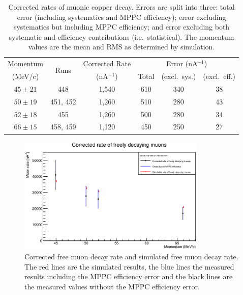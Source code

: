 \begin{table}
  \begin{center}
  \begin{tabular}{c | c | c | c | c | c}
    Momentum  & \multirow{2}{*}{Runs}  &  Corrected Rate  &  \multicolumn{3}{c}{Error (nA\(^{-1}\))}   \\
     (MeV/c)  &                        &  (nA\(^{-1}\))  &  Total  &  (excl.\ sys.)  &  (excl.\ eff.) \\
    \hline
    \(45 \pm 21\)  &       448  &  1,540  &  610  &  340  &  38  \\
    \(50 \pm 19\)  &  451, 452  &  1,260  &  510  &  280  &  43  \\
    \(52 \pm 18\)  &       455  &  1,260  &  500  &  280  &  34  \\
    \(66 \pm 15\)  &  458, 459  &  1,120  &  450  &  250  &  27  \\
  \end{tabular}
  \end{center}
  \caption{Corrected rates of muonic copper decay. Errors are split into three: total error (including systematics and MPPC efficiency); error excluding systematics but including MPPC efficiency; and error excluding both systematic and efficiency contributions (i.e.\ statistical). The momentum values are the mean and RMS as determined by simulation.}
  \label{tab:adjusted_cu_rates}
\end{table}

\begin{figure}[hptb] 
  \centering
    \includegraphics[width=0.8\textwidth]{images/plot_generating_scripts/adjusted_muon_rates.eps}
  \caption{Corrected free muon decay rate and simulated free muon decay rate. The red lines are the simulated results, the blue lines the measured results including the MPPC efficiency error and the black lines are the measured values without the MPPC efficiency error.}
  \label{fig:images_plot_generating_scripts_adjusted_muon_rates}
\end{figure}

